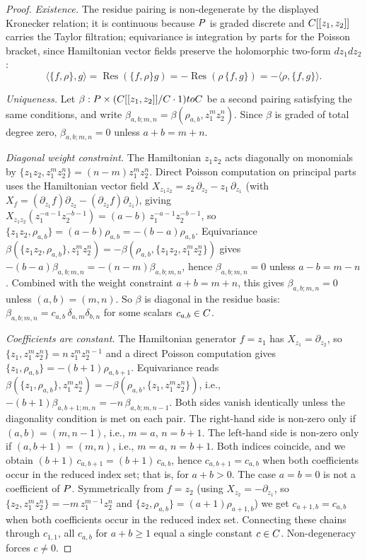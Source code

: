 \documentclass[11pt]{memoir}
\begin{document}
\begin{proof}
  \emph{Existence.} The residue pairing is non-degenerate by the displayed
  Kronecker relation; it is continuous because $P$ is graded discrete
  and $C[[z_1,z_2]]$ carries the Taylor filtration; equivariance is
  integration by parts for the Poisson bracket, since Hamiltonian vector
  fields preserve the holomorphic two-form $dz_1dz_2$:
  $$\langle\{f,\rho\},g\rangle
    =\operatorname{Res}(\{f,\rho\}g)
    =-\operatorname{Res}(\rho\,\{f,g\})
    =-\langle\rho,\{f,g\}\rangle.$$

  \emph{Uniqueness.} Let
  $\beta:P\times(C[[z_1,z_2]]/C\cdot1)toC$ be a second pairing
  satisfying the same conditions, and write
  $\beta_{a,b;m,n}=\beta(\rho_{a,b},z_1^mz_2^n)$. Since $\beta$ is graded
  of total degree zero, $\beta_{a,b;m,n}=0$ unless $a+b=m+n$.

  \emph{Diagonal weight constraint.} The Hamiltonian $z_1z_2$ acts
  diagonally on monomials by
  $\{z_1z_2,z_1^mz_2^n\}=(n-m)z_1^mz_2^n$. Direct Poisson computation on
  principal parts uses the Hamiltonian vector field
  $X_{z_1z_2}=z_2\,\partial_{z_2}-z_1\,\partial_{z_1}$
  (with $X_f=(\partial_{z_1}f)\partial_{z_2}-(\partial_{z_2}f)\partial_{z_1}$),
  giving
  $X_{z_1z_2}(z_1^{-a-1}z_2^{-b-1})=(a-b)\,z_1^{-a-1}z_2^{-b-1}$, so
  $\{z_1z_2,\rho_{a,b}\}=(a-b)\rho_{a,b}=-(b-a)\rho_{a,b}$. Equivariance
  $\beta(\{z_1z_2,\rho_{a,b}\},z_1^mz_2^n)
   =-\beta(\rho_{a,b},\{z_1z_2,z_1^mz_2^n\})$ gives
  $-(b-a)\beta_{a,b;m,n}=-(n-m)\beta_{a,b;m,n}$,
  hence $\beta_{a,b;m,n}=0$ unless $a-b=m-n$. Combined with the weight
  constraint $a+b=m+n$, this gives $\beta_{a,b;m,n}=0$ unless
  $(a,b)=(m,n)$. So $\beta$ is diagonal in the residue basis:
  $\beta_{a,b;m,n}=c_{a,b}\,\delta_{a,m}\delta_{b,n}$ for some scalars
  $c_{a,b}\in C$.

  \emph{Coefficients are constant.} The Hamiltonian generator $f=z_1$ has
  $X_{z_1}=\partial_{z_2}$, so $\{z_1,z_1^mz_2^n\}=n\,z_1^mz_2^{n-1}$ and
  a direct Poisson computation gives
  $\{z_1,\rho_{a,b}\}=-(b+1)\rho_{a,b+1}$. Equivariance reads
  $\beta(\{z_1,\rho_{a,b}\},z_1^mz_2^n)
   =-\beta(\rho_{a,b},\{z_1,z_1^mz_2^n\})$, i.e.,
  $-(b+1)\beta_{a,b+1;m,n}=-n\,\beta_{a,b;m,n-1}$.
  Both sides vanish identically unless the diagonality condition is met
  on each pair. The right-hand side is non-zero only if $(a,b)=(m,n-1)$,
  i.e., $m=a$, $n=b+1$. The left-hand side is non-zero only if
  $(a,b+1)=(m,n)$, i.e., $m=a$, $n=b+1$. Both indices coincide, and we
  obtain $(b+1)\,c_{a,b+1}=(b+1)\,c_{a,b}$, hence $c_{a,b+1}=c_{a,b}$ when
  both coefficients occur in the reduced index set; that is, for
  \(a+b>0\).  The case \(a=b=0\) is not a coefficient of \(P\).
  Symmetrically from $f=z_2$ (using
  $X_{z_2}=-\partial_{z_1}$, so
  $\{z_2,z_1^mz_2^n\}=-m\,z_1^{m-1}z_2^n$ and
  $\{z_2,\rho_{a,b}\}=(a+1)\rho_{a+1,b}$) we get $c_{a+1,b}=c_{a,b}$ when
  both coefficients occur in the reduced index set. Connecting these
  chains through \(c_{1,1}\), all $c_{a,b}$ for $a+b\ge1$ equal a single
  constant $c\in C$. Non-degeneracy forces $c\neq0$.


\end{proof}
\end{document}
